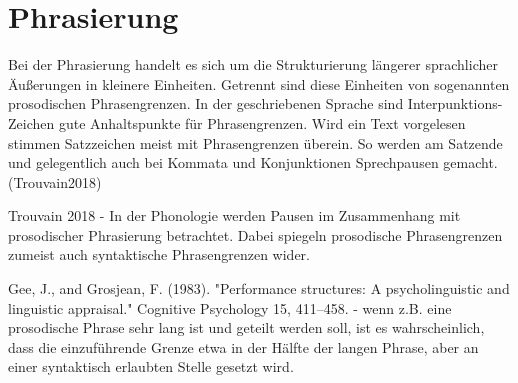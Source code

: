 








\section{Phrasierung}
\label{sec:Phrasierung}

Bei der Phrasierung handelt es sich um die Strukturierung längerer sprachlicher Äußerungen in kleinere Einheiten. Getrennt sind diese Einheiten von sogenannten prosodischen Phrasengrenzen. In der geschriebenen Sprache sind Interpunktions-Zeichen gute Anhaltspunkte für Phrasengrenzen. Wird ein Text vorgelesen stimmen Satzzeichen meist mit Phrasengrenzen überein. So werden am Satzende und gelegentlich auch bei Kommata und Konjunktionen Sprechpausen gemacht. (Trouvain2018)

Trouvain 2018 - In der Phonologie werden Pausen im Zusammenhang mit prosodischer Phrasierung betrachtet.
Dabei spiegeln prosodische Phrasengrenzen zumeist auch syntaktische Phrasengrenzen wider. 

Gee, J., and Grosjean, F. (1983). "Performance structures: A psycholinguistic and linguistic appraisal." Cognitive Psychology 15, 411--458. -  wenn z.B. eine prosodische Phrase sehr lang ist und geteilt werden
soll, ist es wahrscheinlich, dass die einzuführende Grenze etwa in der Hälfte der langen Phrase, aber an einer syntaktisch erlaubten Stelle gesetzt wird. 